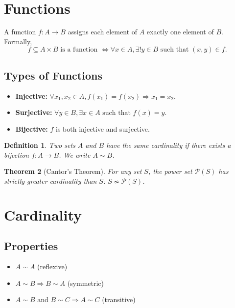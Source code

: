 \documentclass{article}
\newtheorem{theorem}{Theorem}[section]
\newtheorem{definition}[theorem]{Definition}
\begin{document}
\section{Functions}

A function \( f : A \to B \) assigns each element of \( A \) exactly one element of \( B \). Formally,
\[
f \subseteq A \times B \text{ is a function } \Leftrightarrow \forall x \in A, \exists! y \in B \text{ such that } (x, y) \in f.
\]

\subsection*{Types of Functions}

\begin{itemize}
    \item \textbf{Injective:} \( \forall x_1, x_2 \in A, f(x_1) = f(x_2) \Rightarrow x_1 = x_2 \).
    \item \textbf{Surjective:} \( \forall y \in B, \exists x \in A \text{ such that } f(x) = y \).
    \item \textbf{Bijective:} \( f \) is both injective and surjective.
\end{itemize}

\begin{definition}
Two sets \( A \) and \( B \) have the same cardinality if there exists a bijection \( f : A \to B \). We write \( A \sim B \).
\end{definition}

\begin{theorem}[Cantor's Theorem]
For any set \( S \), the power set \( \mathcal{P}(S) \) has strictly greater cardinality than \( S \): \( S \not\sim \mathcal{P}(S) \).
\end{theorem}

\section{Cardinality}

\subsection*{Properties}
\begin{itemize}
    \item \( A \sim A \) (reflexive)
    \item \( A \sim B \Rightarrow B \sim A \) (symmetric)
    \item \( A \sim B \text{ and } B \sim C \Rightarrow A \sim C \) (transitive)
\end{itemize}
\end{document}
